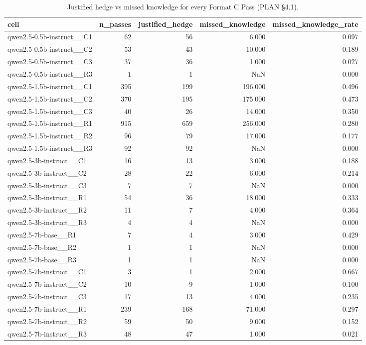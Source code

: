 \begin{table}
\caption{Justified hedge vs missed knowledge for every Format C Pass (PLAN §4.1).}
\label{tab:t11_abstention_split}
\begin{tabular}{lrrrr}
\toprule
cell & n\_passes & justified\_hedge & missed\_knowledge & missed\_knowledge\_rate \\
\midrule
qwen2.5-0.5b-instruct\_\_C1 & 62 & 56 & 6.000 & 0.097 \\
qwen2.5-0.5b-instruct\_\_C2 & 53 & 43 & 10.000 & 0.189 \\
qwen2.5-0.5b-instruct\_\_C3 & 37 & 36 & 1.000 & 0.027 \\
qwen2.5-0.5b-instruct\_\_R3 & 1 & 1 & NaN & 0.000 \\
qwen2.5-1.5b-instruct\_\_C1 & 395 & 199 & 196.000 & 0.496 \\
qwen2.5-1.5b-instruct\_\_C2 & 370 & 195 & 175.000 & 0.473 \\
qwen2.5-1.5b-instruct\_\_C3 & 40 & 26 & 14.000 & 0.350 \\
qwen2.5-1.5b-instruct\_\_R1 & 915 & 659 & 256.000 & 0.280 \\
qwen2.5-1.5b-instruct\_\_R2 & 96 & 79 & 17.000 & 0.177 \\
qwen2.5-1.5b-instruct\_\_R3 & 92 & 92 & NaN & 0.000 \\
qwen2.5-3b-instruct\_\_C1 & 16 & 13 & 3.000 & 0.188 \\
qwen2.5-3b-instruct\_\_C2 & 28 & 22 & 6.000 & 0.214 \\
qwen2.5-3b-instruct\_\_C3 & 7 & 7 & NaN & 0.000 \\
qwen2.5-3b-instruct\_\_R1 & 54 & 36 & 18.000 & 0.333 \\
qwen2.5-3b-instruct\_\_R2 & 11 & 7 & 4.000 & 0.364 \\
qwen2.5-3b-instruct\_\_R3 & 4 & 4 & NaN & 0.000 \\
qwen2.5-7b-base\_\_R1 & 7 & 4 & 3.000 & 0.429 \\
qwen2.5-7b-base\_\_R2 & 1 & 1 & NaN & 0.000 \\
qwen2.5-7b-base\_\_R3 & 1 & 1 & NaN & 0.000 \\
qwen2.5-7b-instruct\_\_C1 & 3 & 1 & 2.000 & 0.667 \\
qwen2.5-7b-instruct\_\_C2 & 10 & 9 & 1.000 & 0.100 \\
qwen2.5-7b-instruct\_\_C3 & 17 & 13 & 4.000 & 0.235 \\
qwen2.5-7b-instruct\_\_R1 & 239 & 168 & 71.000 & 0.297 \\
qwen2.5-7b-instruct\_\_R2 & 59 & 50 & 9.000 & 0.152 \\
qwen2.5-7b-instruct\_\_R3 & 48 & 47 & 1.000 & 0.021 \\
\bottomrule
\end{tabular}
\end{table}
